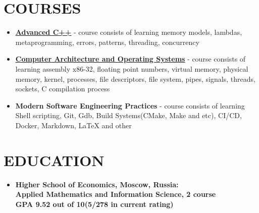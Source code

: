 \documentclass[paper=a4,fontsize=15pt]{scrartcl} %
\newcommand{\NewPart}[2]{\section*{\uppercase{#1} \small \normalfont #2}}
\begin{document}
\NewPart{Courses}{}

\begin{itemize}
  \item \textbf{\href{https://github.com/DenisOstashov/cpp-advanced-hse}{\underline{Advanced C++}}} - course consists of learning memory models, lambdas, metaprogramming, errors, patterns, threading, concurrency
  
\item \textbf{\href{https://github.com/DenisOstashov/CAOS}{\underline{Computer Architecture and Operating Systems}}} - course consists of learning assembly x86-32, floating point numbers, virtual memory, physical memory, kernel, processes, file descriptors, file system, pipes, signals, threads, sockets, C compilation process
  
 \item \textbf{Modern Software Engineering Practices} - course consists of learning Shell scripting, Git, Gdb, Build Systems(CMake, Make and etc), CI/CD, Docker, Markdown, LaTeX and other
  
\end{itemize}
\NewPart{Education}{}

\begin{itemize}

\item \textbf{Higher School of Economics, Moscow, Russia:\\Applied Mathematics and Information Science, 2 course\\GPA 9.52 out of 10(5/278 in	current rating)} 
\end{itemize}
\end{document}
